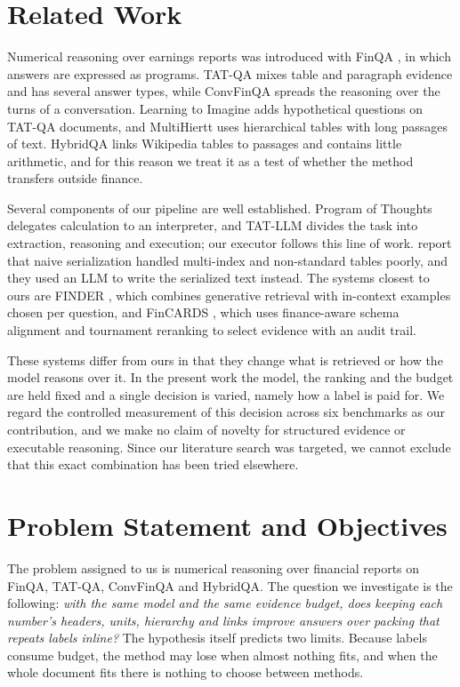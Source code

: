 \documentclass[11pt]{article}
\begin{document}
\section{Related Work}
\label{sec:related}
Numerical reasoning over earnings reports was introduced with FinQA \citep{finqa}, in
which answers are expressed as programs. TAT-QA \citep{tatqa} mixes table and paragraph
evidence and has several answer types, while ConvFinQA \citep{convfinqa} spreads the
reasoning over the turns of a conversation. Learning to Imagine \citep{tathqa} adds
hypothetical questions on TAT-QA documents, and MultiHiertt \citep{multihiertt} uses
hierarchical tables with long passages of text. HybridQA \citep{hybridqa} links
Wikipedia tables to passages and contains little arithmetic, and for this reason we
treat it as a test of whether the method transfers outside finance.

Several components of our pipeline are well established. Program of Thoughts \citep{pot}
delegates calculation to an interpreter, and TAT-LLM \citep{tatllm} divides the task
into extraction, reasoning and execution; our executor follows this line of work. \citet{arun2023} report that
naive serialization handled multi-index and non-standard tables poorly, and they used
an LLM to write the serialized text instead. The systems closest to ours are FINDER
\citep{finder}, which combines generative retrieval with in-context examples chosen per
question, and FinCARDS \citep{fincards}, which uses finance-aware schema alignment and
tournament reranking to select evidence with an audit trail.

These systems differ from ours in that they change what is retrieved or how the model
reasons over it. In the present work the model, the ranking and the budget are held
fixed and a single decision is varied, namely how a label is paid for. We regard the
controlled measurement of this decision across six benchmarks as our contribution, and
we make no claim of novelty for structured evidence or executable reasoning. Since our
literature search was targeted, we cannot exclude that this exact combination has been
tried elsewhere.

\section{Problem Statement and Objectives}
\label{sec:problem}
The problem assigned to us is numerical reasoning over financial reports on FinQA,
TAT-QA, ConvFinQA and HybridQA. The question we investigate is the following:
\emph{with the same model and the same evidence budget, does keeping each number's
headers, units, hierarchy and links improve answers over packing that repeats labels
inline?} The hypothesis itself predicts two limits. Because labels consume budget, the
method may lose when almost nothing fits, and when the whole document fits there is
nothing to choose between methods.
\end{document}
